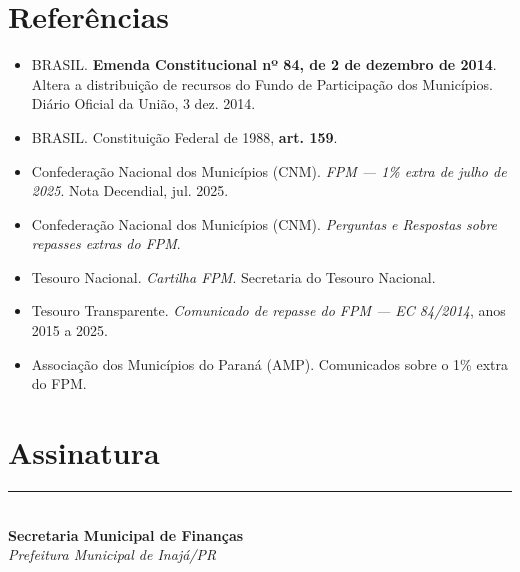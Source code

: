 \documentclass[12pt,a4paper]{article}
\newcommand{\municipio}{Inajá}
\newcommand{\uf}{PR}
\newcommand{\responsavel}{Secretaria Municipal de Finanças}
\begin{document}
\section{Referências}

\begin{itemize}[leftmargin=2.5em,itemsep=0.2em]
  \item BRASIL. \textbf{Emenda Constitucional nº 84, de 2 de dezembro de 2014}. Altera a distribuição de recursos do Fundo de Participação dos Municípios. Diário Oficial da União, 3 dez. 2014.
  \item BRASIL. Constituição Federal de 1988, \textbf{art. 159}.
  \item Confederação Nacional dos Municípios (CNM). \textit{FPM --- 1\% extra de julho de 2025}. Nota Decendial, jul. 2025.
  \item Confederação Nacional dos Municípios (CNM). \textit{Perguntas e Respostas sobre repasses extras do FPM}.
  \item Tesouro Nacional. \textit{Cartilha FPM}. Secretaria do Tesouro Nacional.
  \item Tesouro Transparente. \textit{Comunicado de repasse do FPM --- EC 84/2014}, anos 2015 a 2025.
  \item Associação dos Municípios do Paraná (AMP). Comunicados sobre o 1\% extra do FPM.
\end{itemize}

\section{Assinatura}

\vspace{1.5cm}
\begin{center}
\rule{8cm}{0.4pt}\\[0.2cm]
\textbf{\responsavel}\\[0.1cm]
\textit{Prefeitura Municipal de \municipio/\uf}
\end{center}
\end{document}
